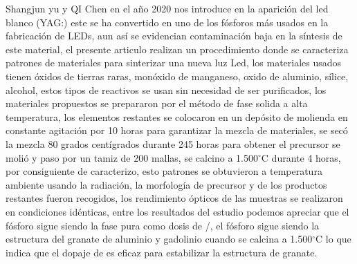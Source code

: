 Shangjun yu y QI Chen en el año 2020  nos introduce en la aparición del led
blanco (YAG:) este se ha convertido en uno de los fósforos más
usados en la fabricación de LEDs, aun así se evidencian contaminación baja  en
la síntesis de este material, el presente articulo  realizan un procedimiento
donde se caracteriza patrones de materiales para sinterizar una nueva luz Led,
los materiales usados tienen óxidos de tierras raras, monóxido de manganeso,
oxido de aluminio, sílice, alcohol,  estos tipos de reactivos se usan sin
necesidad de ser purificados,  los materiales propuestos se prepararon por el
método  de fase solida a alta temperatura, los elementos restantes se colocaron
en un depósito de molienda en constante agitación por 10 horas para garantizar
la mezcla de materiales, se secó la mezcla 80 grados centígrados durante 245
horas para obtener el precursor se molió y paso por un tamiz de 200 mallas, se
calcino  a  1.500$^{\circ}$C durante 4 horas, por consiguiente de caracterizo, esto
patrones se obtuvieron a temperatura ambiente usando la radiación, la
morfología de precursor y de los productos restantes  fueron recogidos, los
rendimiento ópticos de  las muestras se realizaron  en condiciones idénticas,
entre los resultados del estudio podemos apreciar que el fósforo sigue siendo
la fase pura como dosis de /, el fósforo sigue siendo
la estructura del granate de aluminio y gadolinio cuando se calcina a 1.500$^{\circ}$C
lo que indica que el dopaje  de  es eficaz para estabilizar  la
estructura de granate\cite{Yu2021}.\\

